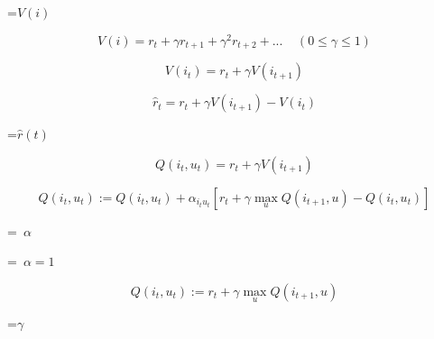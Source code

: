 {\newpage
\clearpage
\samepage \setbox\sizebox=\hbox{$V(i)$}\box\sizebox
}

{\newpage
\clearpage
\samepage \begin{displaymath}V(i) = r_t + \gamma r_{t+1} + \gamma^2 r_{t+2} + ...
~~~~~(0 \le \gamma \le 1)\end{displaymath}
}

{\newpage
\clearpage
\samepage \begin{displaymath}V( i_t )  = r_t + \gamma V( i_{t+1} ) \end{displaymath}
}

{\newpage
\clearpage
\samepage \begin{displaymath}\hat{r}_t = r_t + \gamma V( i_{t+1} ) - V( i_t ) \end{displaymath}
}

{\newpage
\clearpage
\samepage \setbox\sizebox=\hbox{$\hat{r}(t)$}\box\sizebox
}

{\newpage
\clearpage
\samepage \begin{displaymath}Q(i_t, u_t) = r_t + \gamma V ( i_{t+1} ) \end{displaymath}
}

{\newpage
\clearpage
\samepage \begin{displaymath}%
Q(i_t, u_t) :=
Q(i_t, u_t) + \alpha_{i_tu_t}
\left [ r_t + \gamma \max_u Q(i_{t+1},u) - Q(i_t, u_t) \right ] \end{displaymath}
}

{\newpage
\clearpage
\samepage \setbox\sizebox=\hbox{%
$\alpha$}\box\sizebox
}

{\newpage
\clearpage
\samepage \setbox\sizebox=\hbox{%
$\alpha = 1$}\box\sizebox
}

{\newpage
\clearpage
\samepage \begin{displaymath}Q(i_t, u_t) := r_t + \gamma \max_u Q(i_{t+1},u) \end{displaymath}
}

{\newpage
\clearpage
\samepage \setbox\sizebox=\hbox{$\gamma$}\box\sizebox
}

